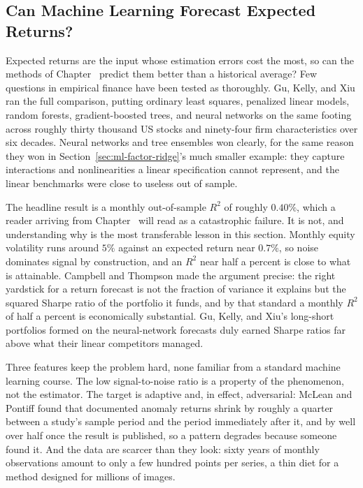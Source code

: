 \documentclass[../ai_in_finance]{subfiles}
\begin{document}
\subsection{Can Machine Learning Forecast Expected Returns?}
\label{sec:ml-expected-returns}

Expected returns are the input whose estimation errors cost the most, so can the methods of Chapter~ predict them better than a historical average? Few questions in empirical finance have been tested as thoroughly. Gu, Kelly, and Xiu ran the full comparison, putting ordinary least squares, penalized linear models, random forests, gradient-boosted trees, and neural networks on the same footing across roughly thirty thousand US stocks and ninety-four firm characteristics over six decades. Neural networks and tree ensembles won clearly, for the same reason they won in Section~\ref{sec:ml-factor-ridge}'s much smaller example: they capture interactions and nonlinearities a linear specification cannot represent, and the linear benchmarks were close to useless out of sample.

The headline result is a monthly out-of-sample $R^2$ of roughly $0.40\%$, which a reader arriving from Chapter~ will read as a catastrophic failure. It is not, and understanding why is the most transferable lesson in this section. Monthly equity volatility runs around $5\%$ against an expected return near $0.7\%$, so noise dominates signal by construction, and an $R^2$ near half a percent is close to what is attainable. Campbell and Thompson made the argument precise: the right yardstick for a return forecast is not the fraction of variance it explains but the squared Sharpe ratio of the portfolio it funds, and by that standard a monthly $R^2$ of half a percent is economically substantial. Gu, Kelly, and Xiu's long-short portfolios formed on the neural-network forecasts duly earned Sharpe ratios far above what their linear competitors managed.

Three features keep the problem hard, none familiar from a standard machine learning course. The low signal-to-noise ratio is a property of the phenomenon, not the estimator. The target is adaptive and, in effect, adversarial: McLean and Pontiff found that documented anomaly returns shrink by roughly a quarter between a study's sample period and the period immediately after it, and by well over half once the result is published, so a pattern degrades because someone found it. And the data are scarcer than they look: sixty years of monthly observations amount to only a few hundred points per series, a thin diet for a method designed for millions of images.
\end{document}
